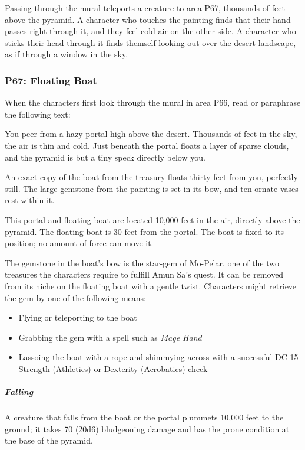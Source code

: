 \documentclass[10pt,a4paper,twoside,bg=print,twocolumn,openany,nodeprecatedcode]{dndbook}
\begin{document}
Passing through the mural teleports a creature to area P67, thousands of feet above the pyramid. A character who touches the painting finds that their hand passes right through it, and they feel cold air on the other side. A character who sticks their head through it finds themself looking out over the desert landscape, as if through a window in the sky.

\subsubsection{P67: Floating Boat}
When the characters first look through the mural in area P66, read or paraphrase the following text:

\begin{DndReadAloud}{}
You peer from a hazy portal high above the desert. Thousands of feet in the sky, the air is thin and cold. Just beneath the portal floats a layer of sparse clouds, and the pyramid is but a tiny speck directly below you.

An exact copy of the boat from the treasury floats thirty feet from you, perfectly still. The large gemstone from the painting is set in its bow, and ten ornate vases rest within it.

\end{DndReadAloud}

This portal and floating boat are located 10,000 feet in the air, directly above the pyramid. The floating boat is 30 feet from the portal. The boat is fixed to its position; no amount of force can move it.

The gemstone in the boat's bow is the star-gem of Mo-Pelar, one of the two treasures the characters require to fulfill Amun Sa's quest. It can be removed from its niche on the floating boat with a gentle twist. Characters might retrieve the gem by one of the following means:


\begin{itemize}
\item Flying or teleporting to the boat
\item Grabbing the gem with a spell such as \textit{Mage Hand}
\item Lassoing the boat with a rope and shimmying across with a successful DC 15 Strength (Athletics) or Dexterity (Acrobatics) check
\end{itemize}

\subparagraph{Falling}
A creature that falls from the boat or the portal plummets 10,000 feet to the ground; it takes 70 (20d6) bludgeoning damage and has the prone condition at the base of the pyramid.
\end{document}
